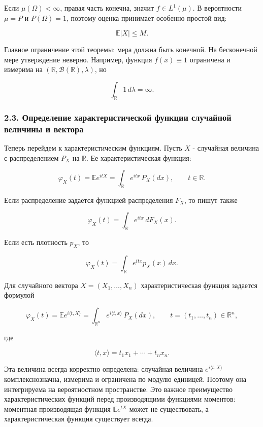 \documentclass[
  11pt,
  a4paper,
]{article}
\begin{document}
Если \(\mu(\Omega)<\infty\), правая часть конечна, значит
\(f\in L^1(\mu)\). В вероятности \(\mu=P\) и \(P(\Omega)=1\), поэтому
оценка принимает особенно простой вид:

\[
\mathbb E|X|\le M.
\]

Главное ограничение этой теоремы: мера должна быть конечной. На
бесконечной мере утверждение неверно. Например, функция \(f(x)\equiv1\)
ограничена и измерима на \((\mathbb R,\mathcal B(\mathbb R),\lambda)\),
но

\[
\int_{\mathbb R} 1\,d\lambda=\infty.
\]

\subsubsection{2.3. Определение характеристической функции случайной
величины и
вектора}\label{ux43eux43fux440ux435ux434ux435ux43bux435ux43dux438ux435-ux445ux430ux440ux430ux43aux442ux435ux440ux438ux441ux442ux438ux447ux435ux441ux43aux43eux439-ux444ux443ux43dux43aux446ux438ux438-ux441ux43bux443ux447ux430ux439ux43dux43eux439-ux432ux435ux43bux438ux447ux438ux43dux44b-ux438-ux432ux435ux43aux442ux43eux440ux430}

Теперь перейдем к характеристическим функциям. Пусть \(X\) - случайная
величина с распределением \(P_X\) на \(\mathbb R\). Ее
характеристическая функция:

\[
\varphi_X(t)=\mathbb E e^{itX}
=\int_{\mathbb R} e^{itx}\,P_X(dx),
\qquad t\in\mathbb R.
\]

Если распределение задается функцией распределения \(F_X\), то пишут
также

\[
\varphi_X(t)=\int_{\mathbb R} e^{itx}\,dF_X(x).
\]

Если есть плотность \(p_X\), то

\[
\varphi_X(t)=\int_{\mathbb R} e^{itx}p_X(x)\,dx.
\]

Для случайного вектора \(X=(X_1,\ldots,X_n)\) характеристическая функция
задается формулой

\[
\varphi_X(t)
=\mathbb E e^{i\langle t,X\rangle}
=\int_{\mathbb R^n} e^{i\langle t,x\rangle}\,P_X(dx),
\qquad t=(t_1,\ldots,t_n)\in\mathbb R^n,
\]

где

\[
\langle t,x\rangle=t_1x_1+\cdots+t_nx_n.
\]

Эта величина всегда корректно определена: случайная величина
\(e^{i\langle t,X\rangle}\) комплекснозначна, измерима и ограничена по
модулю единицей. Поэтому она интегрируема на вероятностном пространстве.
Это важное преимущество характеристических функций перед производящими
функциями моментов: моментная производящая функция \(\mathbb E e^{tX}\)
может не существовать, а характеристическая функция существует всегда.
\end{document}
